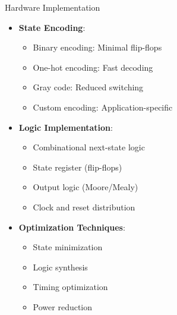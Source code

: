 \documentclass[aspectratio=169,11pt]{beamer}
\newcommand{\concept}[1]{\textbf{\color{accentcolor}#1}}
\begin{document}
\begin{frame}{Hardware Implementation}
\begin{itemize}
\item \concept{State Encoding}:
\begin{itemize}
\item Binary encoding: Minimal flip-flops
\item One-hot encoding: Fast decoding
\item Gray code: Reduced switching
\item Custom encoding: Application-specific
\end{itemize}
\vspace{0.5cm}
\item \concept{Logic Implementation}:
\begin{itemize}
\item Combinational next-state logic
\item State register (flip-flops)
\item Output logic (Moore/Mealy)
\item Clock and reset distribution
\end{itemize}
\vspace{0.3cm}
\item \concept{Optimization Techniques}:
\begin{itemize}
\item State minimization
\item Logic synthesis
\item Timing optimization
\item Power reduction
\end{itemize}
\end{itemize}
\end{frame}
\end{document}
